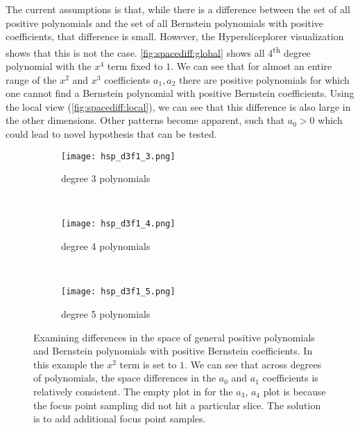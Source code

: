 The current assumptions is that, while there is a difference between the set of all positive polynomials and the set of all Bernstein polynomials with positive coefficients,
that difference is small. However, the Hypersliceplorer visualization shows
that this is not the case. \autoref{fig:spacediff:global} 
shows all 4\textsuperscript{th} degree polynomial with the $x^4$ term fixed to
$1$. We can see that for almost an entire range of the $x^2$ and $x^3$
coefficients $a_1, a_2$ there are positive polynomials for which one cannot find a
Bernstein polynomial with positive Bernstein coefficients. Using the local view
(\autoref{fig:spacediff:local}), we can see that this difference is also
large in the other dimensions. Other patterns become apparent, such that $a_0>0$ which could lead to novel hypothesis that can be tested.

\begin{figure*}
  \centering
  \begin{subfigure}[b]{0.3\textwidth}
    \texttt{[image: hsp\_d3f1\_3.png]}
    \caption{degree 3 polynomials}
    \label{fig:dimcmp:3}
  \end{subfigure}
  ~
  \begin{subfigure}[b]{0.3\textwidth}
    \texttt{[image: hsp\_d3f1\_4.png]}
    \caption{degree 4 polynomials}
    \label{fig:dimcmp:4}
  \end{subfigure}
  ~
  \begin{subfigure}[b]{0.3\textwidth}
    \texttt{[image: hsp\_d3f1\_5.png]}
    \caption{degree 5 polynomials}
    \label{fig:dimcmp:5}
  \end{subfigure}
  \caption[Differences in the space of general positive polynomials and Bernstein polynomials with positive Bernstein coefficients.]{%
    Examining differences in the space of general positive polynomials and Bernstein 
    polynomials with positive Bernstein coefficients. In this example the 
    $x^2$ term is set to $1$. We can see that across degrees of polynomials,
    the space differences in the $a_0$ and $a_1$ coefficients is relatively
    consistent. The empty plot in  for the $a_3$, $a_4$
    plot is because the focus point sampling did not hit a particular slice.
    The solution is to add additional focus point samples. 
  }
  \label{fig:dimcmp}
\end{figure*}


